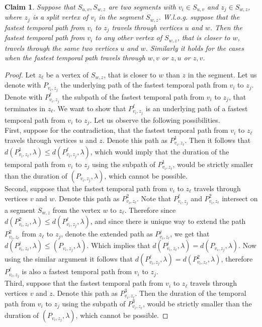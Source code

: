 \documentclass[11pt,a4paper]{article}
\newtheorem{claim}[theorem]{Claim}
\theoremstyle{remark}
\theoremstyle{definition}
\begin{document}

\begin{claim}\label{claim:FPT-unlabeldPaths-01}
    Suppose that
    $S_{u,v}, S_{w,z}$ are two segments with $ v_i \in S_{u,v}$ and $z_j \in S_{w,z}$,
    where $z_j$ is a split vertex of $v_i$ in the segment $S_{w,z}$.
    W.l.o.g. suppose that the fastest temporal path from $v_i$ to $z_j$ travels through vertices $u$ and $w$.
    Then the fastest temporal path from $v_i$ to any other vertex of $S_{w,z}$, that is closer to $w$,
    travels through the same two vertices $u$ and $w$.
    Similarly it holds for the cases when the fastest temporal path travels through $w,v$ or $z,u$ or $z,v$.
\end{claim}
\begin{proof}
    Let $z_\ell$ be a vertex of $S_{w,z}$, that is closer to $w$ than $z$ in the segment.
    Let us denote with $P_{v_i,z_j}$ the underlying path of the fastest temporal path from $v_i$ to $z_j$.
    Denote with $P_{v_i,z_j}^\ell$
    the subpath of the fastest temporal path from $v_i$ to $z_j$, that terminates in $z_\ell$.
    We want to show that $P_{v_i,z_j}^\ell$ is an underlying path of a fastest temporal path from $v_i$ to $z_j$.
    Let us observe the following possibilities.
    \\
    First, suppose for the contradiction, that the fastest temporal path from $v_i$ to $z_\ell$ travels through vertices $u$ and $z$.
    Denote this path as $P^1_{v_i,z_\ell}$.
    Then it follows that $d(P^1_{v_i,z_\ell}, \lambda) \leq d(P_{v_i,z_j}^\ell,\lambda)$, which would imply that
    the duration of the temporal path from $v_i$ to $z_j$ using the subpath of $P^1_{v_i,z_\ell}$, would be strictly smaller than the duration of $(P_{v_i,z_j},\lambda)$, which cannot be possible.
    \\
    Second, suppose that the fastest temporal path from $v_i$ to $z_\ell$ travels through vertices $v$ and $w$.
    Denote this path as $P^2_{v_i,z_\ell}$.
    Note that $P_{v_i,z_j}^\ell$ and $P^2_{v_i,z_\ell}$ intersect on a segment $S_{w,z}$ from the vertex $w$ to $z_\ell$.
    Therefore since
    $d(P^2_{v_i,z_\ell}, \lambda) \leq d(P_{v_i,z_j}^\ell,\lambda)$,
    and since there is unique way to
    extend the path $P^2_{v_i,z_\ell}$ from $z_\ell$ to $z_j$, denote the extended path as $P^j_{v_i,z_\ell}$,
    we get that $d(P^j_{v_i,z_\ell}, \lambda) \leq $$(P_{v_i,z_j},\lambda)$.
    Which implies that $d(P^j_{v_i,z_\ell}, \lambda) = d(P_{v_i,z_j}, \lambda)$.
    Now using the similar argument it follows that $d(P_{v_i,z_j}^\ell, \lambda) = d(P^2_{v_i,z_\ell}, \lambda)$,
    therefore $P_{v_i,z_j}^\ell$ is also a fastest temporal path from $v_i$ to $z_j$.
    \\
    Third, suppose that the fastest temporal path from $v_i$ to $z_\ell$ travels through vertices $v$ and $z$.
    Denote this path as $P^3_{v_i,z_\ell}$.
    Then the duration of the temporal path from $v_i$ to $z_j$ using the subpath of $P^3_{v_i,z_\ell}$, would be strictly smaller than the duration of $(P_{v_i,z_j},\lambda)$, which cannot be possible.
\end{proof}
\end{document}
